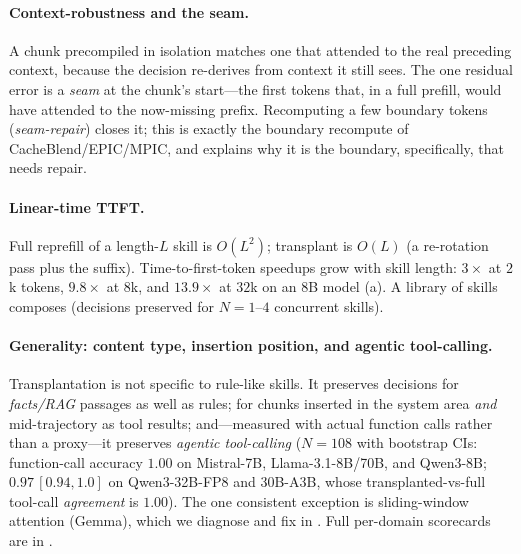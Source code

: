 \paragraph{Context-robustness and the seam.} A chunk precompiled in isolation matches one that attended to
the real preceding context, because the decision re-derives from context it still sees. The one residual
error is a \emph{seam} at the chunk's start---the first tokens that, in a full prefill, would have
attended to the now-missing prefix. Recomputing a few boundary tokens (\emph{seam-repair}) closes it; this
is exactly the boundary recompute of CacheBlend/EPIC/MPIC, and  explains why it is
the boundary, specifically, that needs repair.

\paragraph{Linear-time TTFT.} Full reprefill of a length-$L$ skill is $O(L^2)$; transplant is $O(L)$ (a
re-rotation pass plus the suffix). Time-to-first-token speedups grow with skill length: $3\times$ at $2$k
tokens, $9.8\times$ at $8$k, and $13.9\times$ at $32$k on an $8$B model (a). A library of
skills composes (decisions preserved for $N=1$--$4$ concurrent skills).

\paragraph{Generality: content type, insertion position, and agentic tool-calling.} Transplantation is not specific to rule-like
skills. It preserves decisions for \emph{facts/RAG} passages as well as rules; for chunks inserted in the
system area \emph{and} mid-trajectory as tool results; and---measured with actual function calls rather
than a proxy---it preserves \emph{agentic tool-calling} ($N{=}108$ with bootstrap CIs: function-call
accuracy $1.00$ on Mistral-7B, Llama-3.1-8B/70B, and Qwen3-8B; $0.97\,[0.94,1.0]$ on Qwen3-32B-FP8 and
30B-A3B, whose transplanted-vs-full tool-call \emph{agreement} is $1.00$). The one consistent exception
is sliding-window attention (Gemma), which we diagnose and fix in . Full per-domain
scorecards are in .
